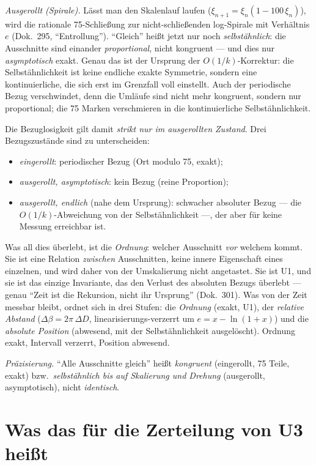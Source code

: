 \emph{Ausgerollt (Spirale).} Lässt man den Skalenlauf laufen
($\xi_{n+1}=\xi_n(1-100\,\xi_n)$), wird die rationale 75-Schließung zur nicht-schließenden
log-Spirale mit Verhältnis $e$ (Dok.~295, \enquote{Entrollung}). \enquote{Gleich} heißt
jetzt nur noch \emph{selbstähnlich}: die Ausschnitte sind einander \emph{proportional}, nicht
kongruent --- und dies nur \emph{asymptotisch} exakt. Genau das ist der Ursprung der
$O(1/k)$-Korrektur: die Selbstähnlichkeit ist keine endliche exakte Symmetrie, sondern eine
kontinuierliche, die sich erst im Grenzfall voll einstellt. Auch der periodische Bezug
verschwindet, denn die Umläufe sind nicht mehr kongruent, sondern nur proportional; die 75
Marken verschmieren in die kontinuierliche Selbstähnlichkeit.

Die Bezuglosigkeit gilt damit \emph{strikt nur im ausgerollten Zustand}. Drei Bezugszustände
sind zu unterscheiden:
\begin{itemize}
\item \emph{eingerollt}: periodischer Bezug (Ort modulo 75, exakt);
\item \emph{ausgerollt, asymptotisch}: kein Bezug (reine Proportion);
\item \emph{ausgerollt, endlich} (nahe dem Ursprung): schwacher absoluter Bezug --- die
$O(1/k)$-Abweichung von der Selbstähnlichkeit ---, der aber für keine Messung erreichbar ist.
\end{itemize}

Was all dies überlebt, ist die \emph{Ordnung}: welcher Ausschnitt \emph{vor} welchem kommt.
Sie ist eine Relation \emph{zwischen} Ausschnitten, keine innere Eigenschaft eines einzelnen,
und wird daher von der Umskalierung nicht angetastet. Sie ist U1, und sie ist das einzige
Invariante, das den Verlust des absoluten Bezugs überlebt --- genau \enquote{Zeit ist die
Rekursion, nicht ihr Ursprung} (Dok.~301). Was von der Zeit messbar bleibt, ordnet sich in
drei Stufen: die \emph{Ordnung} (exakt, U1), der \emph{relative Abstand}
($\Delta\beta=2\pi\,\Delta D$, linearisierungs-verzerrt um $e=x-\ln(1+x)$) und die
\emph{absolute Position} (abwesend, mit der Selbstähnlichkeit ausgelöscht). Ordnung exakt,
Intervall verzerrt, Position abwesend.

\emph{Präzisierung.} \enquote{Alle Ausschnitte gleich} heißt \emph{kongruent} (eingerollt, 75
Teile, exakt) bzw.\ \emph{selbstähnlich bis auf Skalierung und Drehung} (ausgerollt,
asymptotisch), nicht \emph{identisch}.

\section{Was das für die Zerteilung von U3 heißt}

